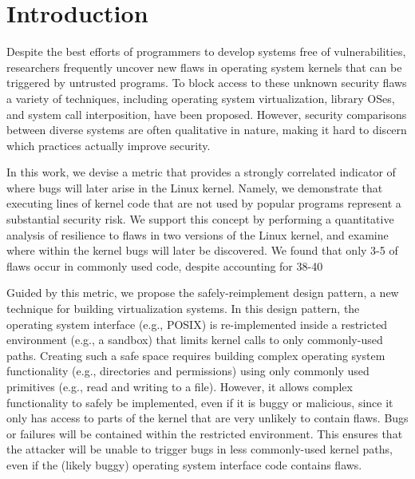 \section{Introduction}
\label{sec.introduction}

Despite the best efforts of programmers to develop systems free of vulnerabilities,
researchers frequently uncover new flaws in operating system kernels that can be
triggered by untrusted programs. To block access to these unknown security flaws
a variety of techniques, including operating system virtualization, library OSes,
and system call interposition, have been proposed. However, security comparisons
between diverse systems are often qualitative in nature, making it hard to
discern which practices actually improve security.

In this work, we devise a metric that provides a strongly correlated 
indicator of where bugs will later arise in the Linux kernel. Namely, we demonstrate
that executing lines of kernel code that are not used by popular programs represent
a substantial security risk. We support this concept by performing a quantitative
 analysis of resilience to flaws in two versions of the Linux kernel, and examine
where within the kernel bugs will later be discovered. We found that only 3-5%
  of flaws occur in commonly used code, despite accounting for
 38-40%

Guided by this metric, we propose the safely-reimplement design pattern, a new
technique for building virtualization systems. In this design pattern, the operating
system interface (e.g., POSIX) is re-implemented inside a restricted environment
(e.g., a sandbox) that limits kernel calls to only commonly-used paths.
Creating such a safe space requires building complex operating system functionality
(e.g., directories and permissions) using only commonly used primitives (e.g.,
read and writing to a file). However, it allows complex functionality to safely
be implemented, even if it is buggy or malicious, since it only has access to
parts of the kernel that are very unlikely to contain flaws. Bugs or failures
will be contained within the restricted environment. This ensures that the attacker
will be unable to trigger bugs in less commonly-used kernel paths, even if the
 (likely buggy) operating system interface code contains flaws.

